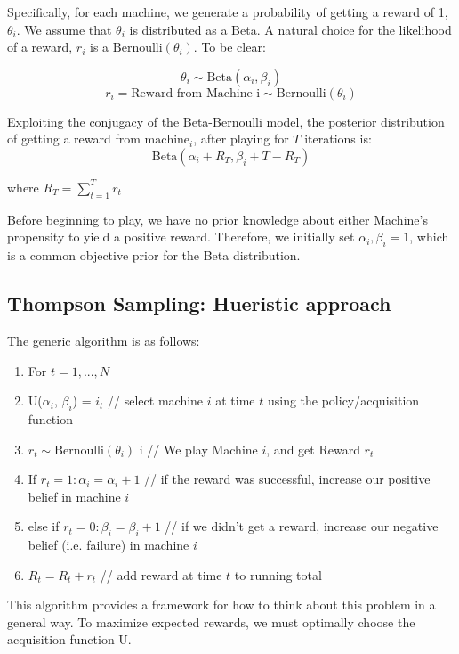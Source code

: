 \documentclass{article}
\begin{document}
Specifically, for each machine, we generate a probability of getting a reward of 1, $\theta_i$. We assume that $\theta_i$ is distributed as a Beta. A natural choice for the likelihood of a reward, $r_i$ is a $\text{Bernoulli}(\theta_i)$. To be clear:

$$\theta_i \sim \text{Beta}(\alpha_i, \beta_i)$$
$$r_i = \text{Reward from Machine i} \sim \text{Bernoulli}(\theta_i)$$

Exploiting the conjugacy of the Beta-Bernoulli model, the posterior distribution of getting a reward from $\text{machine}_i$, after playing for $T$ iterations is:
$$\text{Beta}(\alpha_i + R_{T}, \beta_i + T - R_{T})$$

where $R_{T} = \sum_{t=1}^{T}r_{t}$

Before beginning to play, we have no prior knowledge about either Machine's propensity to yield a positive reward. Therefore, we initially set $\alpha_i, \beta_i = 1$, which is a common objective prior for the Beta distribution.\\

\subsection{Thompson Sampling: Hueristic approach}

The generic algorithm is as follows:

\begin{enumerate}
\item For $t = 1, ..., N$
\item U($\alpha_i$, $\beta_i$) = $i_t$  // select machine $i$ at time $t$ using the policy/acquisition function
\item $r_t \sim \text{Bernoulli}(\theta_{i})$  i  // We play Machine $i$, and get Reward $r_t$
\item If $r_t = 1: \alpha_i = \alpha_i + 1$   // if the reward was successful, increase our positive belief in machine $i$
\item else if $r_t = 0: \beta_i = \beta_i + 1$  // if we didn't get a reward, increase our negative belief (i.e. failure) in machine $i$
\item $R_t = R_t + r_t$		// add reward at time $t$ to running total
\end{enumerate}

This algorithm provides a framework for how to think about this problem in a general way. To maximize expected rewards, we must optimally choose the acquisition function U.
\end{document}
